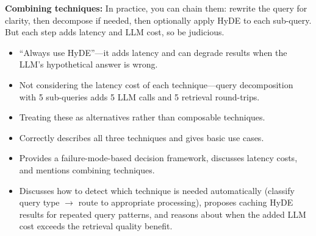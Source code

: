\begin{interviewq}
\textbf{Combining techniques:} In practice, you can chain them: rewrite the query for clarity, then decompose if needed, then optionally apply HyDE to each sub-query. But each step adds latency and LLM cost, so be judicious.

\redflags
\begin{itemize}
    \item ``Always use HyDE''---it adds latency and can degrade results when the LLM's hypothetical answer is wrong.
    \item Not considering the latency cost of each technique---query decomposition with 5 sub-queries adds 5 LLM calls and 5 retrieval round-trips.
    \item Treating these as alternatives rather than composable techniques.
\end{itemize}


\goodgreat
\begin{itemize}
    \item {} Correctly describes all three techniques and gives basic use cases.
    \item {} Provides a failure-mode-based decision framework, discusses latency costs, and mentions combining techniques.
    \item {} Discusses how to detect which technique is needed automatically (classify query type $\rightarrow$ route to appropriate processing), proposes caching HyDE results for repeated query patterns, and reasons about when the added LLM cost exceeds the retrieval quality benefit.
\end{itemize}

\end{interviewq}


